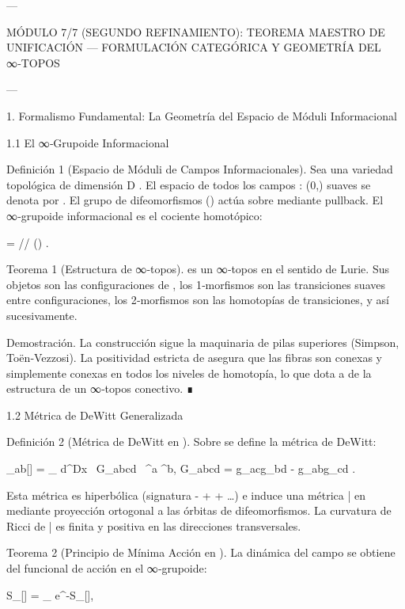 \documentclass[12pt,twoside]{book}
\begin{document}
---

MÓDULO 7/7 (SEGUNDO REFINAMIENTO): TEOREMA MAESTRO DE UNIFICACIÓN — FORMULACIÓN CATEGÓRICA Y GEOMETRÍA DEL ∞‑TOPOS

---

1. Formalismo Fundamental: La Geometría del Espacio de Móduli Informacional

1.1 El ∞‑Grupoide Informacional

Definición 1 (Espacio de Móduli de Campos Informacionales). Sea    una variedad topológica de dimensión  D . El espacio de todos los campos  \rho :  \to (0,\infty)  suaves se denota por   . El grupo de difeomorfismos  ()  actúa sobre    mediante pullback. El ∞‑grupoide informacional    es el cociente homotópico:

 =  /\!/ () .

Teorema 1 (Estructura de ∞‑topos).    es un ∞‑topos en el sentido de Lurie. Sus objetos son las configuraciones de  \rho , los 1‑morfismos son las transiciones suaves entre configuraciones, los 2‑morfismos son las homotopías de transiciones, y así sucesivamente.

Demostración. La construcción sigue la maquinaria de pilas superiores (Simpson, Toën‑Vezzosi). La positividad estricta de  \rho  asegura que las fibras son conexas y simplemente conexas en todos los niveles de homotopía, lo que dota a    de la estructura de un ∞‑topos conectivo. ∎

1.2 Métrica de DeWitt Generalizada

Definición 2 (Métrica de DeWitt en   ). Sobre    se define la métrica de DeWitt:

_{ab}[\rho] = \int_{} d^Dx  \, G_{abcd} \, \delta\rho^a \delta\rho^b,
\quad G_{abcd} = g_{ac}g_{bd} - g_{ab}g_{cd} .

Esta métrica es hiperbólica (signatura  - + + \dots ) e induce una métrica  \bar{}  en    mediante proyección ortogonal a las órbitas de difeomorfismos. La curvatura de Ricci de  \bar{}  es finita y positiva en las direcciones transversales.

Teorema 2 (Principio de Mínima Acción en   ). La dinámica del campo  \rho  se obtiene del funcional de acción en el ∞‑grupoide:

S_{}[\rho] = \int_{} \rho {} e^{-S_{}[\rho]},
\end{document}
